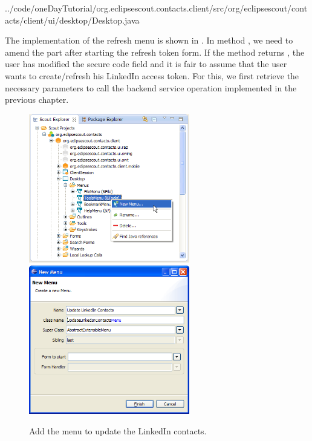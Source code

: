 \documentclass[a4paper,10pt,twoside]{book}
\begin{document}

{../code/oneDayTutorial/org.eclipsescout.contacts.client/src/org/eclipsescout/contacts/client/ui/desktop/Desktop.java}

The implementation of the refresh menu is shown in . 
In method , we need to amend the part after starting the refresh token form. 
If the method  returns , the user has modified the secure code field and it is fair to assume that the user wants to create/refresh his LinkedIn access token. 
For this, we first retrieve the necessary parameters to call the backend service operation  implemented in the previous chapter. 

\begin{figure}
\includegraphics[width=7cm]{new_menu_updatecontacts_contextmenu.png} \hspace{5mm}
\includegraphics[width=7cm]{new_menu_updatecontacts.png}
\caption{Add the menu to update the LinkedIn contacts.}
\end{figure}
\end{document}
